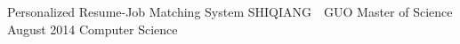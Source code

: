 \maketitlepage
{Personalized Resume-Job Matching System
}   %
{SHIQIANG~~GUO}%
{Master of Science}                %
{August 2014}%
{Computer Science}         %
